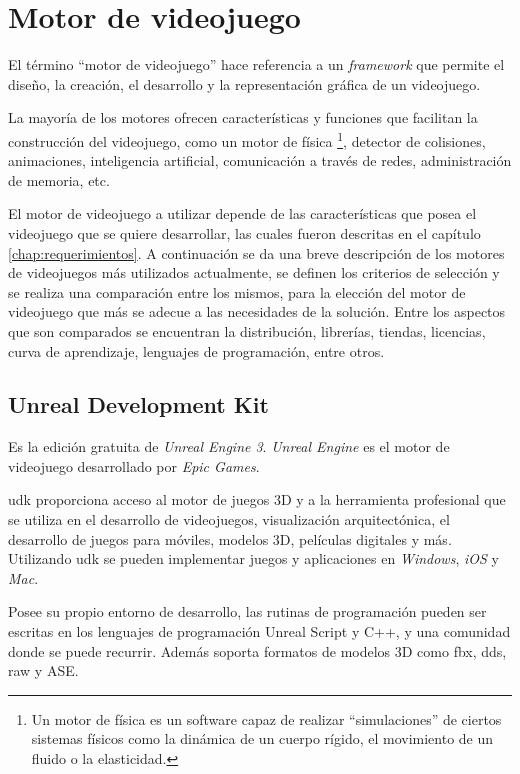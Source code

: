 \section{Motor de videojuego}
\label{sec:motores}

El término \enquote{motor de videojuego} hace referencia a un \textit{framework}
 que permite el diseño, la creación, el desarrollo y la
representación gráfica de un videojuego\cite{videojuego:telechea}.

La mayoría de los motores ofrecen características y
funciones que facilitan la construcción del videojuego, como un motor de física
\footnote{Un motor de física es un software capaz de realizar \enquote{simulaciones} de ciertos sistemas físicos
como la dinámica de un cuerpo rígido, el movimiento de un fluido o la
elasticidad\cite{videojuego:telechea}.}, detector de colisiones, animaciones,
inteligencia artificial, comunicación a través de redes,
administración de memoria, etc\cite{videojuego:telechea}.

El motor de videojuego a utilizar depende de las características que posea el
videojuego que se quiere desarrollar, las cuales
fueron descritas en el capítulo \ref{chap:requerimientos}. A continuación se da una breve
descripción de los motores de videojuegos más utilizados actualmente, se definen
los criterios de selección y se realiza una comparación entre los mismos, para
la elección del motor de videojuego que más se adecue a las necesidades de la
solución. Entre los aspectos que son comparados se encuentran la distribución,
librerías, tiendas, licencias, curva de aprendizaje, lenguajes de programación,
entre otros.

\subsection{Unreal Development Kit}

Es la edición gratuita de \textit{Unreal Engine 3}. \textit{Unreal Engine} es el
motor de videojuego desarrollado por \textit{Epic Games}\cite{unrealengine}.

\Gls{udk} proporciona acceso al motor de juegos 3D y a la herramienta
profesional que se utiliza en el desarrollo de videojuegos, visualización arquitectónica, el desarrollo de juegos
para móviles, modelos 3D, películas digitales y más. Utilizando \Gls{udk} se
pueden implementar juegos y aplicaciones en \textit{Windows}, \textit{iOS} y
\textit{Mac}\cite{unrealengine}.

Posee su propio entorno de desarrollo, las rutinas de programación pueden ser escritas 
en los lenguajes de programación Unreal Script y C++, y una comunidad 
donde se puede recurrir. Además soporta formatos de modelos 
3D como fbx, dds, raw y ASE\cite{unrealengine}.

